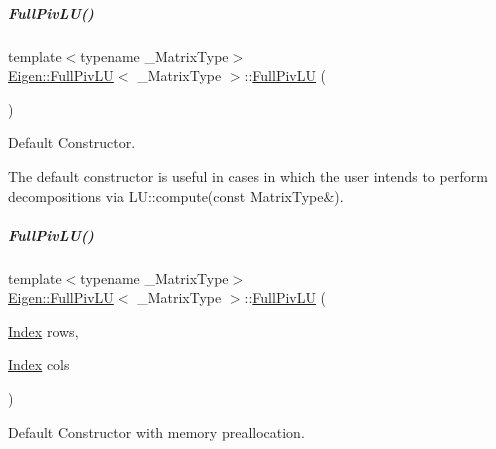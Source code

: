 \mbox{\label{group___l_u___module_a6e370c34e2f7e7ee1b122a76dc4cae9c}} 
\subparagraph{\texorpdfstring{Full\+Piv\+L\+U()}{FullPivLU()}\hspace{0.1cm}{\footnotesize\ttfamily [5/8]}}
{\footnotesize\ttfamily template$<$typename \+\_\+\+Matrix\+Type$>$ \\
\hyperlink{group___l_u___module_class_eigen_1_1_full_piv_l_u}{Eigen\+::\+Full\+Piv\+LU}$<$ \+\_\+\+Matrix\+Type $>$\+::\hyperlink{group___l_u___module_class_eigen_1_1_full_piv_l_u}{Full\+Piv\+LU} (\begin{DoxyParamCaption}{ }\end{DoxyParamCaption})}



Default Constructor. 

The default constructor is useful in cases in which the user intends to perform decompositions via L\+U\+::compute(const Matrix\+Type\&). \mbox{\label{group___l_u___module_acc9bf9c70a2a8b146d5b9419fddd6502}} 
\subparagraph{\texorpdfstring{Full\+Piv\+L\+U()}{FullPivLU()}\hspace{0.1cm}{\footnotesize\ttfamily [6/8]}}
{\footnotesize\ttfamily template$<$typename \+\_\+\+Matrix\+Type$>$ \\
\hyperlink{group___l_u___module_class_eigen_1_1_full_piv_l_u}{Eigen\+::\+Full\+Piv\+LU}$<$ \+\_\+\+Matrix\+Type $>$\+::\hyperlink{group___l_u___module_class_eigen_1_1_full_piv_l_u}{Full\+Piv\+LU} (\begin{DoxyParamCaption}\item[{\hyperlink{group___core___module_a554f30542cc2316add4b1ea0a492ff02}{Index}}]{rows,  }\item[{\hyperlink{group___core___module_a554f30542cc2316add4b1ea0a492ff02}{Index}}]{cols }\end{DoxyParamCaption})}



Default Constructor with memory preallocation. 

